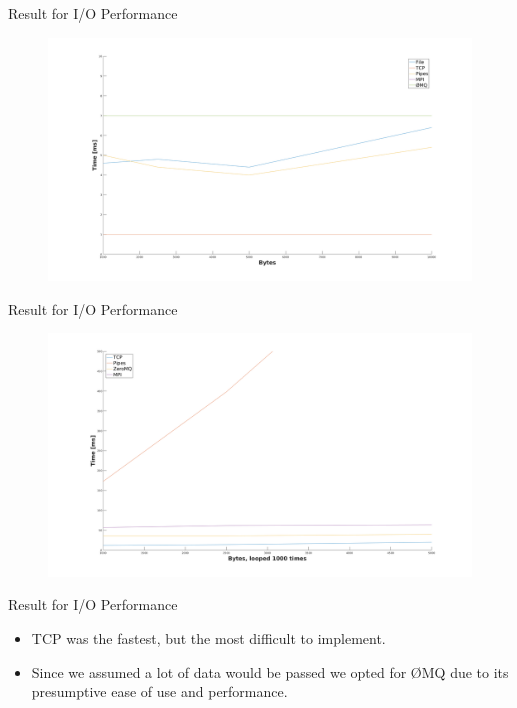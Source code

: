 \documentclass{beamer}
\begin{document}
    \begin{frame}{Result for I/O Performance}
    \begin{figure}[h!]
        \centering
        \includegraphics[width=1\columnwidth]{singlerun-nf}
    \end{figure}
    \end{frame}
    \begin{frame}{Result for I/O Performance}
    \begin{figure}[h!]
        \centering
        \includegraphics[width=1\columnwidth]{thousandrun-nf}
    \end{figure}
    \end{frame}
    \begin{frame}{Result for I/O Performance}
    \begin{itemize}[<+->]
        \item TCP was the fastest, but the most difficult to implement.
        \item Since we assumed a lot of data would be passed we opted for ØMQ
              due to its presumptive ease of use and performance.
    \end{itemize}
    \end{frame}
\end{document}
